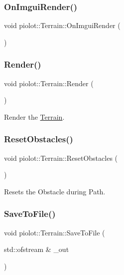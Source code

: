 \subsubsection{\texorpdfstring{On\+Imgui\+Render()}{OnImguiRender()}}
{\footnotesize\ttfamily void piolot\+::\+Terrain\+::\+On\+Imgui\+Render (\begin{DoxyParamCaption}{ }\end{DoxyParamCaption})}

\mbox{\label{classpiolot_1_1_terrain_a21bf8a5f9f394709f2e938bf2a62db9c}} 
\subsubsection{\texorpdfstring{Render()}{Render()}}
{\footnotesize\ttfamily void piolot\+::\+Terrain\+::\+Render (\begin{DoxyParamCaption}{ }\end{DoxyParamCaption})}



Render the \mbox{\hyperlink{classpiolot_1_1_terrain}{Terrain}}. 

\mbox{\label{classpiolot_1_1_terrain_ac3809c8441d17080168a077f97827816}} 
\subsubsection{\texorpdfstring{Reset\+Obstacles()}{ResetObstacles()}}
{\footnotesize\ttfamily void piolot\+::\+Terrain\+::\+Reset\+Obstacles (\begin{DoxyParamCaption}{ }\end{DoxyParamCaption})}



Resets the Obstacle during Path. 

\mbox{\label{classpiolot_1_1_terrain_a2a3fee4479a1c367262917e87e80aeae}} 
\subsubsection{\texorpdfstring{Save\+To\+File()}{SaveToFile()}}
{\footnotesize\ttfamily void piolot\+::\+Terrain\+::\+Save\+To\+File (\begin{DoxyParamCaption}\item[{std\+::ofstream \&}]{\+\_\+out }\end{DoxyParamCaption})}



